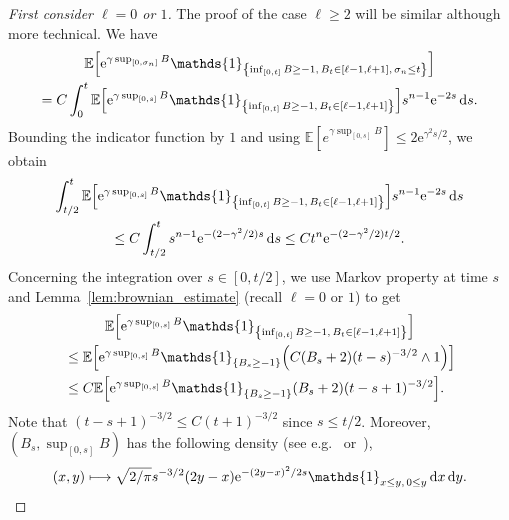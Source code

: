 \documentclass[AHL,Unicode,longabstracts,published]{cedram}
\newcommand{\e}{\mathrm{e}}
\renewcommand{\d}[1]{\mathop{}\!\mathrm{d}#1}
\newcommand{\E}{\mathbb{E}}
\newcommand\1{\mathds{1}}
\let\originalleft\left
\let\originalright\right
\renewcommand{\left}{\mathopen{}\mathclose\bgroup\originalleft}
\renewcommand{\right}{\aftergroup\egroup\originalright}
\let\oldmapsto\mapsto
\renewcommand*{\mapsto}{\mathchoice{\longmapsto}{\oldmapsto}{\oldmapsto}{\oldmapsto}}
\begin{document}
\begin{proofc}
\begin{proof}[{First consider $\ell = 0$ or $1$}]
The proof of the case $\ell \geq 2$ will be similar although more technical. We have
\begin{multline}\label{eq:control_on_E_kl_before_tau_k_integrated_formulation}
\E \left[\e^{\gamma \sup_{[0, \sigma_n]} B} \1_{\left\{\inf_{[0, t]} B \geq -1,\, B_t \in [\ell-1, \ell+1],\, \sigma_n \leq t\right\}} \right] \\
 = C \int_0^t \E \left[\e^{\gamma \sup_{[0, s]} B} \1_{\left\{\inf_{[0, t]} B \geq -1,\, B_t \in [\ell-1, \ell+1]\right\}} \right] s^{n-1} \e^{-2s} \d{s}. 
\end{multline}
Bounding the indicator function by $1$ and using $\E[e^{\gamma \sup_{[0,s]} B}] \leq 2 \e^{\gamma^2s/2}$, we obtain
\begin{multline}\label{eq:control_on_E_kl_before_tau_k_large_s}
\int_{t/2}^t \E \left[\e^{\gamma \sup_{[0, s]} B} \1_{\left\{\inf_{[0, t]} B \geq -1,\, B_t \in [\ell-1, \ell+1]\right\}} \right] s^{n-1} \e^{-2s} \d{s} \\
\leq C \int_{t/2}^t s^{n - 1} \e^{-(2 - \gamma^2/2)s} \d{s}
\leq C t^n \e^{-(2 - \gamma^2/2)t/2}.
\end{multline}
Concerning the integration over $s \in [0, t/2]$, we use Markov property at time $s$ and Lemma~\ref{lem:brownian_estimate} (recall $\ell = 0$ or $1$) to get
\begin{multline}\label{eq:control_on_E_kl_before_tau_k_ballot}
\E \left[\e^{\gamma \sup_{[0, s]} B} \1_{\left\{\inf_{[0, t]} B \geq -1,\, B_t \in [\ell-1, \ell+1]\right\}} \right]
\\
\begin{aligned}
&\leq \E \left[\e^{\gamma \sup_{[0, s]} B} \1_{\{B_s \geq -1\}} \left(C (B_s + 2) (t - s)^{-3/2} \wedge 1 \right) \right]\\
&\leq C \E \left[\e^{\gamma \sup_{[0, s]} B} \1_{\{B_s \geq -1\}} (B_s + 2) (t - s + 1)^{-3/2} \right].
\end{aligned}
\end{multline}
Note that $(t - s + 1)^{-3/2} \leq C(t + 1)^{-3/2}$ since $s \leq t/2$. Moreover, $(B_s, \sup_{[0, s]} B)$ has the following density (see e.g.~\cite[Eq.~2]{Yor1997} or~\cite[Formula~1.1.1.8]{BorodinSalminen2002}),
\begin{equation}\label{eq:density_joint_law_brownian_motion_and_supremum}
(x, y) \mapsto \sqrt{2/\pi} s^{-3/2} (2y - x) \e^{-(2y - x)^2/2s} \1_{x \leq y,\, 0 \leq y} \d{x} \d{y}.

\end{equation}
\end{proof}
\end{proofc}
\end{document}
